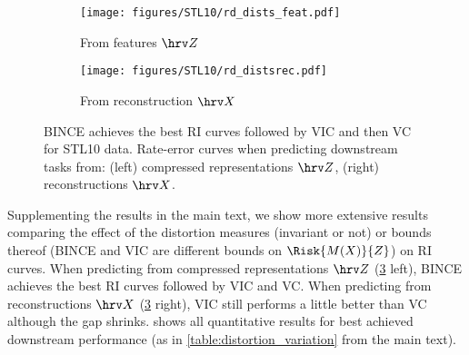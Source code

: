 \documentclass[final]{article}
\begin{document}
\begin{figure}[h]
     \centering
     \begin{subfigure}[h]{0.45\columnwidth}
         \centering
         \texttt{[image: figures/STL10/rd\_dists\_feat.pdf]}
         \caption{From features $\hrv Z$}
         \label{fig:STL10_dist_Z}
     \end{subfigure}
     \hfill{}
     \begin{subfigure}[h]{0.49\columnwidth}
         \centering
         \texttt{[image: figures/STL10/rd\_distsrec.pdf]}
         \caption{From reconstruction $\hrv X$}
         \label{fig:STL10_dist_X}
     \end{subfigure}
\caption{
BINCE achieves the best RI curves followed by VIC and then VC for STL10 data.
Rate-error curves when predicting downstream tasks from: (left) compressed representations $\hrv Z$, (right) reconstructions $\hrv X$.
}
\label{fig:STL10_dist}
\end{figure} 
Supplementing the results in the main text, we show more extensive results comparing the effect of the distortion measures (invariant or not) or bounds thereof (BINCE and VIC are different bounds on $\Risk{M(X)}{Z}$) on RI curves.
When predicting from compressed representations $\hrv Z$  (\cref{fig:STL10_dist} left), BINCE achieves the best RI curves followed by VIC and VC.
When predicting from reconstructions $\hrv X$ (\cref{fig:STL10_dist} right), VIC still performs a little better than VC although the gap shrinks.
 shows all quantitative results for best achieved downstream performance (as in \cref{table:distortion_variation} from the main text).
\end{document}
